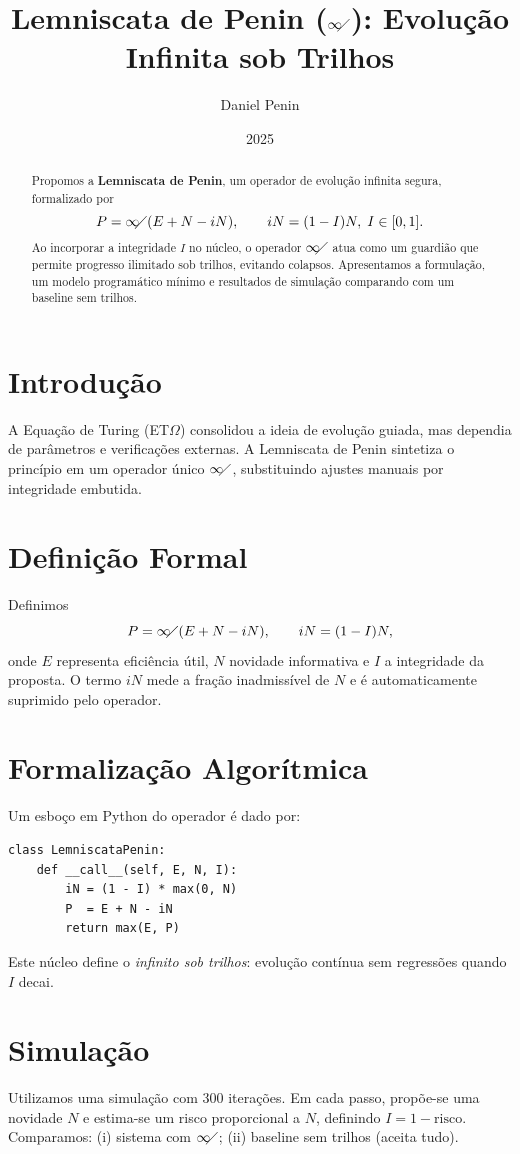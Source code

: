 \documentclass[11pt]{article}
\title{Lemniscata de Penin ($\infty\!\!\diagup$): Evolução Infinita sob Trilhos}
\author{Daniel Penin}
\date{2025}
\begin{document}
\maketitle

\begin{abstract}
Propomos a \textbf{Lemniscata de Penin}, um operador de evolução infinita segura, formalizado por
\[ P = \infty\!\!\diagup(E + N - iN), \qquad iN = (1 - I)N,\; I\in[0,1]. \]
Ao incorporar a integridade $I$ no núcleo, o operador $\infty\!\!\diagup$ atua como um guardião que
permite progresso ilimitado sob trilhos, evitando colapsos. Apresentamos a formulação, um
modelo programático mínimo e resultados de simulação comparando com um baseline sem trilhos.
\end{abstract}

\section{Introdução}
A Equação de Turing (ET$\Omega$) consolidou a ideia de evolução guiada, mas dependia de parâmetros e verificações externas.
A Lemniscata de Penin sintetiza o princípio em um operador único $\infty\!\!\diagup$, substituindo ajustes manuais por integridade embutida.

\section{Definição Formal}
Definimos
\[ P = \infty\!\!\diagup(E + N - iN), \qquad iN = (1 - I)N, \]
onde $E$ representa eficiência útil, $N$ novidade informativa e $I$ a integridade da proposta.
O termo $iN$ mede a fração inadmissível de $N$ e é automaticamente suprimido pelo operador.

\section{Formalização Algorítmica}
Um esboço em Python do operador é dado por:
\begin{verbatim}
class LemniscataPenin:
    def __call__(self, E, N, I):
        iN = (1 - I) * max(0, N)
        P  = E + N - iN
        return max(E, P)
\end{verbatim}
Este núcleo define o \emph{infinito sob trilhos}: evolução contínua sem regressões quando $I$ decai.

\section{Simulação}
Utilizamos uma simulação com 300 iterações. Em cada passo, propõe-se uma novidade $N$ e estima-se um risco
proporcional a $N$, definindo $I=1-\text{risco}$. Comparamos:
(i) sistema com $\infty\!\!\diagup$; (ii) baseline sem trilhos (aceita tudo).
\end{document}
